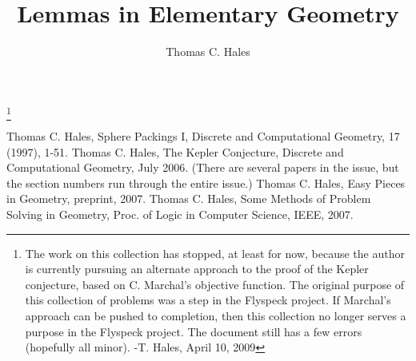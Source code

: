 \documentclass[11pt]{amsart}
\title{Lemmas in Elementary Geometry}
\author{Thomas C. Hales}
\begin{document}
\maketitle

\symbolfootnote[0]{\svninfo\hfil\break}
\footnote{The work on this collection has stopped, at least for now, because the author is currently pursuing an alternate approach to the proof of the Kepler conjecture, based on C. Marchal's objective function.  The original purpose of this collection of problems was a step in the Flyspeck project.  If Marchal's approach can be pushed to completion, then this collection no longer serves a purpose in the Flyspeck project.  The document still has a few errors (hopefully all minor).   -T. Hales, April 10, 2009} %

 








\newpage
\begin{thebibliography}{CHMS94}
 Thomas C. Hales, Sphere Packings I,
    Discrete and Computational Geometry, 17 (1997), 1-51.
 Thomas C. Hales, The Kepler Conjecture, Discrete and
Computational Geometry, July 2006. (There are several papers in
the issue, but the section numbers run through the entire issue.)
 Thomas C. Hales, Easy Pieces in Geometry, preprint, 2007.
 Thomas C. Hales, Some Methods of Problem
Solving in Geometry, Proc. of Logic in Computer Science, IEEE, 2007.
\end{thebibliography}

{


}

\tableofcontents
\end{document}
